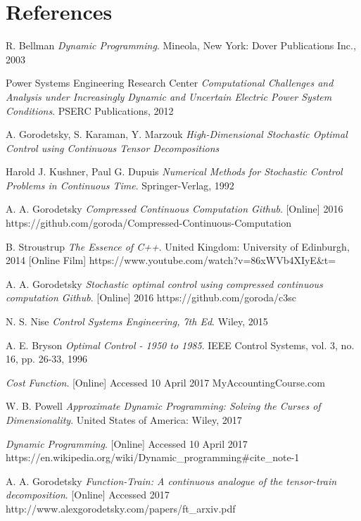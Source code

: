 \documentclass[11pt,draftd]{article}
\begin{document}
\section{References}
\begin{thebibliography}{9}
	R. Bellman
	\textit{Dynamic Programming}. 
	Mineola, New York: Dover Publications Inc., 2003
	
	Power Systems Engineering Research Center
	\textit{Computational Challenges and Analysis under Increasingly Dynamic and Uncertain Electric Power System Conditions}.
	PSERC Publications, 2012
	
	A. Gorodetsky, S. Karaman, Y. Marzouk
	\textit{High-Dimensional Stochastic Optimal Control using Continuous Tensor Decompositions}
	
	Harold J. Kushner, Paul G. Dupuis
	\textit{Numerical Methods for Stochastic Control Problems in Continuous Time}.
	Springer-Verlag, 1992	
	
	A. A. Gorodetsky
	\textit{Compressed Continuous Computation Github}.
	[Online] 2016
	https://github.com/goroda/Compressed-Continuous-Computation
	
	B. Stroustrup
	\textit{The Essence of C++}.
	United Kingdom: University of Edinburgh, 2014
	[Online Film] https://www.youtube.com/watch?v=86xWVb4XIyE\&t=
	
	A. A. Gorodetsky
	\textit{Stochastic optimal control using compressed continuous computation Github}.
	[Online] 2016
	https://github.com/goroda/c3sc
	
	N. S. Nise
	\textit{Control Systems Engineering, 7th Ed}.
	Wiley, 2015
	
	A. E. Bryson 
	\textit{Optimal Control - 1950 to 1985}.
	IEEE Control Systems, vol. 3, no. 16, pp. 26-33, 1996
	
	\textit{Cost Function}.
	[Online] Accessed 10 April 2017
	MyAccountingCourse.com
	
	W. B. Powell
	\textit{Approximate Dynamic Programming: Solving the Curses of Dimensionality}.
	United States of America: Wiley, 2017
	
	\textit{Dynamic Programming}.
	[Online] Accessed 10 April 2017
	https://en.wikipedia.org/wiki/Dynamic\_programming\#cite\_note-1
	
	A. A. Gorodetsky
	\textit{Function-Train: A continuous analogue of the tensor-train decomposition}.
	[Online] Accessed 2017
	http://www.alexgorodetsky.com/papers/ft\_arxiv.pdf
		

\end{thebibliography}
\end{document}
